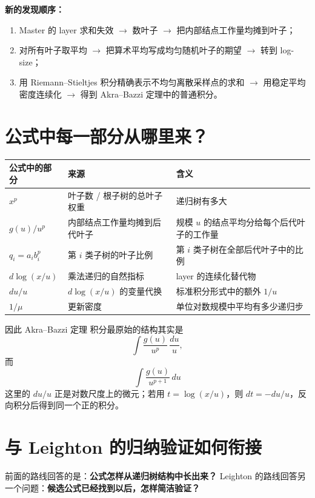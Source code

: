 \documentclass[11pt,a4paper]{article}
\newcommand{\AB}{Akra--Bazzi 定理}
\begin{document}
\begin{tcolorbox}
\textbf{新的发现顺序：}
\begin{enumerate}[label=(\arabic*),leftmargin=2.2em,itemsep=0.28em,topsep=0.28em]
\item Master 的 layer 求和失效 $\to$ 数叶子 $\to$ 把内部结点工作量均摊到叶子；
\item 对所有叶子取平均 $\to$ 把算术平均写成均匀随机叶子的期望 $\to$ 转到 log-size；
\item 用 Riemann--Stieltjes 积分精确表示不均匀离散采样点的求和 $\to$ 用稳定平均密度连续化 $\to$ 得到 Akra--Bazzi 定理中的普通积分。
\end{enumerate}
\end{tcolorbox}

\section{公式中每一部分从哪里来？}
\begin{center}
\begin{tabular}{>{\raggedright\arraybackslash}p{} p{} p{}}
\toprule
公式中的部分 & 来源 & 含义\\
\midrule
$x^p$ & 叶子数 / 根子树的总叶子权重 & 递归树有多大\\
$g(u)/u^p$ & 内部结点工作量均摊到后代叶子 & 规模 $u$ 的结点平均分给每个后代叶子的工作量\\
$q_i=a_i b_i^p$ & 第 $i$ 类子树的叶子比例 & 第 $i$ 类子树在全部后代叶子中的比例\\
$d\log(x/u)$ & 乘法递归的自然指标 & layer 的连续化替代物\\
$du/u$ & $d\log(x/u)$ 的变量代换 & 标准积分形式中的额外 $1/u$\\
$1/\mu$ & 更新密度 & 单位对数规模中平均有多少递归步\\
\bottomrule
\end{tabular}
\end{center}

因此 \AB{} 积分最原始的结构其实是
\[
\int \frac{g(u)}{u^p}\,\frac{du}{u},
\]
而
\[
\int\frac{g(u)}{u^{p+1}}\,du
\]
这里的 $du/u$ 正是对数尺度上的微元；若用 $t=\log(x/u)$，则 $dt=-du/u$，反向积分后得到同一个正的积分。

\iffalse
\section{与 Leighton 的归纳验证如何衔接}
前面的路线回答的是：\textbf{公式怎样从递归树结构中长出来？} Leighton 的路线回答另一个问题：\textbf{候选公式已经找到以后，怎样简洁验证？}
\end{document}
